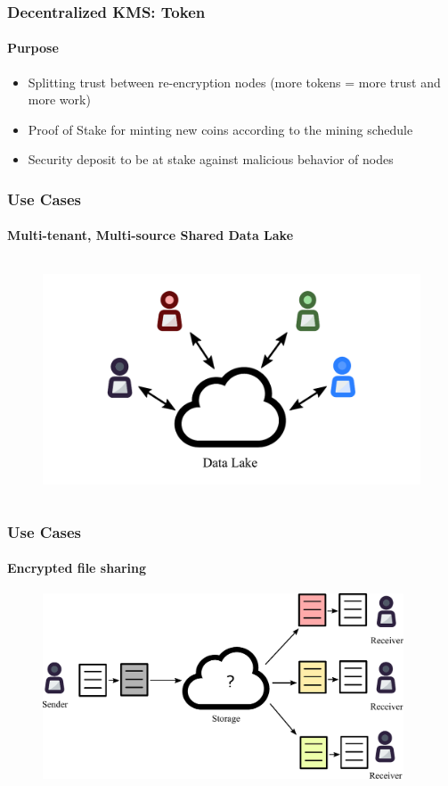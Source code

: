 \documentclass[xetex,mathsans,sans]{beamer}
\begin{document}
    \begin{frame}
        \frametitle{Decentralized KMS: Token}
        \framesubtitle{Purpose}
        \begin{itemize}
            \item Splitting trust between re-encryption nodes (more tokens = more trust and more work)
            \item Proof of Stake for minting new coins according to the mining schedule
            \item Security deposit to be at stake against malicious behavior of nodes
        \end{itemize}
    \end{frame}

    \begin{frame}
        \frametitle{Use Cases}
        \framesubtitle{Multi-tenant, Multi-source Shared Data Lake}
        \begin{figure}
            \centering
            \includegraphics[height=7cm]{pdf/data-lake.pdf}
        \end{figure}
    \end{frame}

    \begin{frame}
        \frametitle{Use Cases}
        \framesubtitle{Encrypted file sharing}
        \begin{figure}
            \centering
            \includegraphics[height=5.5cm]{pdf/file-sharing.pdf}
        \end{figure}
    \end{frame}
\end{document}
